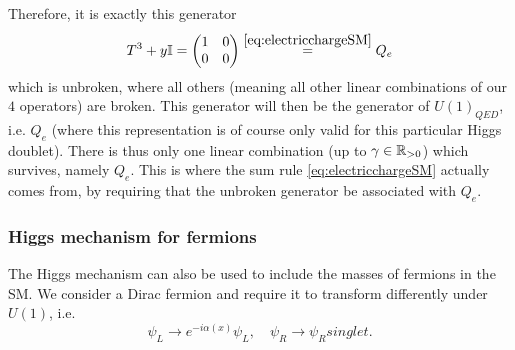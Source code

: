 Therefore, it is exactly this generator
\begin{equation}
T^3+y\mathbb{I}=\begin{pmatrix}
1 & 0 \\
0 & 0 \\
\end{pmatrix}\stackrel{\ref{eq:electricchargeSM}}{=} Q_e
\end{equation}
which is unbroken, where all others (meaning all other linear combinations of our $4$ operators) are broken. This generator will then be the generator of $U(1)_{QED}$, i.e. $Q_e$ (where this representation is of course only valid for this particular Higgs doublet). There is thus only one linear combination (up to $\gamma \in \mathbb{R}_{>0}$) which survives, namely $Q_e$. This is where the sum rule \ref{eq:electricchargeSM} actually comes from, by requiring that the unbroken generator be associated with $Q_e$. 
\subsubsection{Higgs mechanism for fermions}

The Higgs mechanism can also be used to include the masses of fermions in the SM. We consider a Dirac fermion and require it to transform differently under $U(1)$, i.e.
\begin{equation}
\psi_L \rightarrow e^{-i\alpha(x)} \psi_L, \quad \psi_R\rightarrow \psi_R singlet.
\end{equation}

